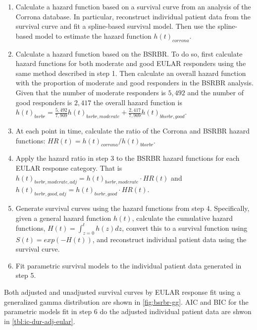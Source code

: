 \documentclass[11pt,final,fleqn]{article}\usepackage[]{graphicx}\usepackage[]{color}
\theoremstyle{plain}
\begin{document}
\begin{enumerate}
\def\labelenumi{\arabic{enumi}.}
\item Calculate a hazard function based on a survival curve from an analysis
  of the Corrona database. In particular, reconstruct individual patient
  data from the survival curve \citet{guyot2012enhanced} and fit a
  spline-based survival model. Then use the spline-based model to
  estimate the hazard function $h(t)_{corrona}$.
\item Calculate a hazard function based on the BSRBR. To do so, first
  calculate hazard functions for both moderate and good EULAR responders
  using the same method described in step 1. Then calculate an overall
  hazard function with the proportion of moderate and good responders in
  the BSRBR analysis. Given that the number of moderate responders is
  \(5,492\) and the number of good responders is $2,417$ the overall
  hazard function is $h(t)_{bsrbr} = \frac{5,492}{7,909}h(t)_{bsrbr, moderate} + \frac{2,417}{7,909}h(t)_{bbsrbr, good}$.
\item At each point in time, calculate the ratio of the Corrona and BSRBR
  hazard functions: $HR(t) = h(t)_{corrona}/h(t)_{bbsrbr}$.
\item Apply the hazard ratio in step 3 to the BSRBR hazard functions for
  each EULAR response category. That is $h(t)_{bsrbr, moderate, adj} = h(t)_{bsrbr, moderate} \cdot HR(t)$ and $h(t)_{bsrbr, good, adj} = h(t)_{bsrbr, good} \cdot HR(t)$.
\item Generate survival curves using the hazard functions from step 4.
  Specifically, given a general hazard function $h(t)$, calculate the
  cumulative hazard functions, $H(t) = \int_{z = 0}^{t} h(z)dz$,
  convert this to a survival function using $S(t) = exp(-H(t))$, and
  reconstruct individual patient data using the survival curve.
\item Fit parametric survival models to the individual patient data
  generated in step 5.
\end{enumerate}

Both adjusted and unadjusted survival curves by EULAR response fit using
a generalized gamma distribution are shown in \autoref{fig:bsrbr-gg}. AIC
and BIC for the parametric models fit in step 6 do the adjusted
individual patient data are shwon in \autoref{tbl:ic-dur-adj-eular}.
\end{document}
